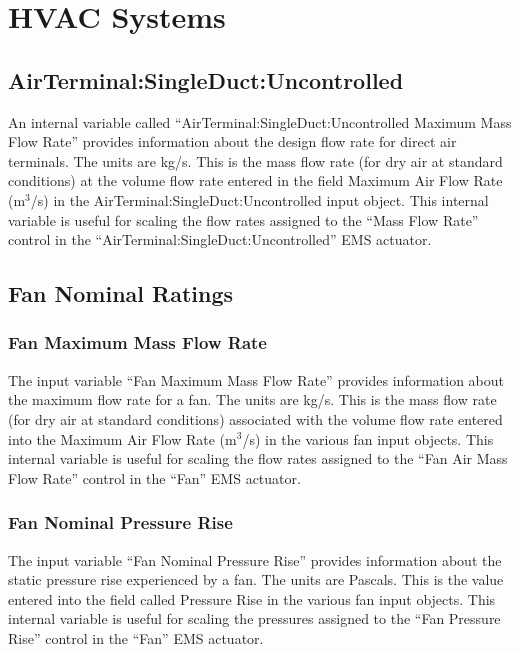 \section{HVAC Systems}\label{hvac-systems-000}

\subsection{AirTerminal:SingleDuct:Uncontrolled}\label{airterminalsingleductuncontrolled-000}

An internal variable called ``AirTerminal:SingleDuct:Uncontrolled Maximum Mass Flow Rate'' provides information about the design flow rate for direct air terminals. The units are kg/s. This is the mass flow rate (for dry air at standard conditions) at the volume flow rate entered in the field Maximum Air Flow Rate (m\(^{3}\)/s) in the AirTerminal:SingleDuct:Uncontrolled input object. This internal variable is useful for scaling the flow rates assigned to the ``Mass Flow Rate'' control in the ``AirTerminal:SingleDuct:Uncontrolled'' EMS actuator.

\subsection{Fan Nominal Ratings}\label{fan-nominal-ratings}

\subsubsection{Fan Maximum Mass Flow Rate}\label{fan-maximum-mass-flow-rate}

The input variable ``Fan Maximum Mass Flow Rate'' provides information about the maximum flow rate for a fan. The units are kg/s. This is the mass flow rate (for dry air at standard conditions) associated with the volume flow rate entered into the Maximum Air Flow Rate (m\(^{3}\)/s) in the various fan input objects. This internal variable is useful for scaling the flow rates assigned to the ``Fan Air Mass Flow Rate'' control in the ``Fan'' EMS actuator.

\subsubsection{Fan Nominal Pressure Rise}\label{fan-nominal-pressure-rise}

The input variable ``Fan Nominal Pressure Rise'' provides information about the static pressure rise experienced by a fan. The units are Pascals. This is the value entered into the field called Pressure Rise in the various fan input objects. This internal variable is useful for scaling the pressures assigned to the ``Fan Pressure Rise'' control in the ``Fan'' EMS actuator.

